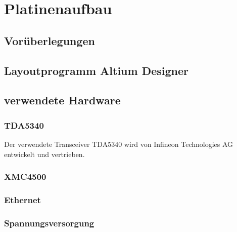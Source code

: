 \chapter{Platinenaufbau}
\label{sec:Platinenaufbau}
\pagestyle{scrheadings}

\section{Vorüberlegungen}

\section{Layoutprogramm Altium Designer}

\section{verwendete Hardware}

\subsection{TDA5340}
Der verwendete Transceiver TDA5340 wird von Infineon Technologies AG  entwickelt und vertrieben. 
\subsection{XMC4500}

\subsection{Ethernet}


\subsection{Spannungsversorgung}